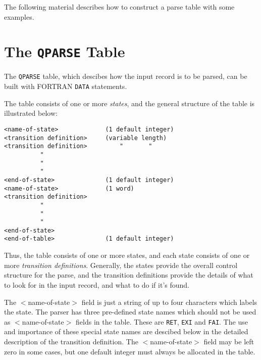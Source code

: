 The following material describes how to construct a
parse table with some examples.
\section{The {\tt QPARSE} Table}
The {\tt QPARSE} table, which descibes how the input record is to be
parsed, can be built with FORTRAN {\tt DATA} statements. 

The table consists
of one or more {\em states}, and the general structure of the table is
illustrated below:
\begin{center}
\begin{verbatim}
<name-of-state>             (1 default integer)
<transition definition>     (variable length)
<transition definition>         "       "
          "
          "
          "
<end-of-state>              (1 default integer)
<name-of-state>             (1 word)
<transition definition>
          "
          "
          "
<end-of-state>
<end-of-table>              (1 default integer)
\end{verbatim}
\end{center}
Thus, the table consists of one or more states, and each state
consists of one or more {\em transition definitions}. Generally, the states
provide the overall control structure for the parse, and the transition
definitions provide the details of what to look for in the input record,
and what to do if it's found.

The $<$name-of-state$>$ field is just a string of up to four
characters which labels the state. The parser has three pre-defined
state names which should not be used as $<$name-of-state$>$ fields in the
table. 
These are {\tt RET}, {\tt EXI} and {\tt FAI}. The use and importance of
these special state names are descibed below in the detailed
description of the transition definition. The $<$name-of-state$>$ field may
be left zero in some cases, but one default integer must always be
allocated in the table.

